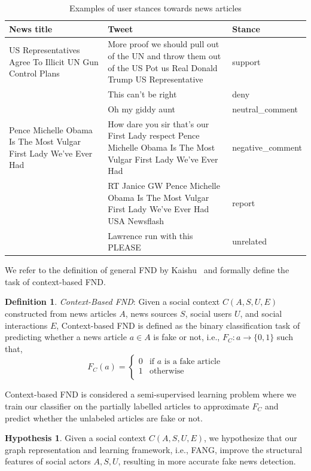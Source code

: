 \documentclass[fyp]{socreport}
\theoremstyle{definition}
\newtheorem{definition}{Definition}[section]
\theoremstyle{hypothesis}
\newtheorem{hypothesis}{Hypothesis}[section]
\begin{document}
\begin{table}[t]
  \centering
  \tiny
  \begin{tabular}{|p{4cm}|p{7cm}|p{2cm}|}
  \hline
    News title & Tweet & Stance \\ \hline \hline
  US Representatives Agree To Illicit UN Gun Control Plans & More proof we should pull out of the UN and throw them out of the US Pot us Real Donald Trump US Representative & support \\ \cline{2-3}
  & This can't be right & deny \\ \cline{2-3}
  & Oh my giddy aunt & neutral\_comment \\ \hline
  Pence Michelle Obama Is The Most Vulgar First Lady We've Ever Had & How dare you sir that's our First Lady respect Pence Michelle Obama Is The Most Vulgar First Lady We've Ever Had & negative\_comment \\ \cline{2-3}
  & RT Janice GW Pence Michelle Obama Is The Most Vulgar First Lady We've Ever Had USA Newsflash & report \\ \cline{2-3}
  & Lawrence run with this PLEASE & unrelated \\ \hline
  \end{tabular}
  \caption{Examples of user stances towards news articles}
  \label{table:stance_examples}
\end{table}

We refer to the definition of general FND by Kaishu~\cite{shu2017fake} and formally define the task of context-based FND.
\begin{definition}{\textit{Context-Based FND}}: Given a social context $C(A,S,U,E)$ constructed from news articles $A$, news sources $S$, social users $U$, and social interactions $E$,
Context-based FND is defined as the binary classification task of predicting whether a news article $a\in A$ is fake or not, i.e.,  $F_C : a \rightarrow \{0,1\}$ such that,
\[  F_C(a) = \left\{
\begin{array}{ll}
      0 & \textrm{if } a \textrm{ is a fake article} \\
      1 & \textrm{otherwise} \\
\end{array} 
\right. \]
\end{definition}
Context-based FND is considered a semi-supervised learning problem where we train our classifier on the partially labelled articles to approximate $F_C$ and predict whether the unlabeled articles are fake or not.
\begin{hypothesis}Given a social context $C(A,S,U,E)$, we hypothesize that our graph representation and learning framework, i.e., FANG, improve the structural features of social actors $A,S,U$, resulting in more accurate fake news detection.
\end{hypothesis}
\end{document}
